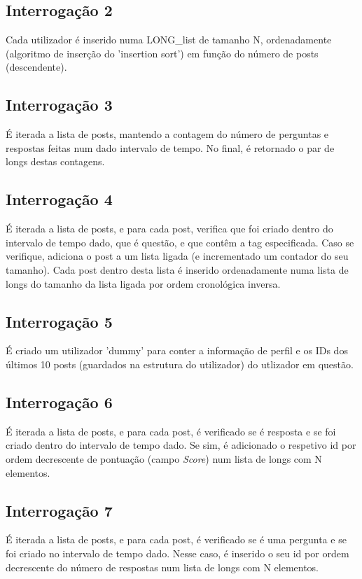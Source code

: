 \documentclass[10pt]{report}
\begin{document}
\subsection{Interrogação 2}
Cada utilizador é inserido numa LONG\_list de tamanho N, ordenadamente (algoritmo de inserção do 'insertion sort') em função do número de posts (descendente).

\subsection{Interrogação 3}
É iterada a lista de posts, mantendo a contagem do número de perguntas e respostas feitas num dado intervalo de tempo. No final, é retornado o par de longs destas contagens.

\subsection{Interrogação 4}
É iterada a lista de posts, e para cada post, verifica que foi criado dentro do intervalo de tempo dado, que é questão, e que contêm a tag especificada. Caso se verifique, adiciona o post a um lista ligada (e incrementado um contador do seu tamanho). Cada post dentro desta lista é inserido ordenadamente numa lista de longs do tamanho da lista ligada por ordem cronológica inversa.

\subsection{Interrogação 5}
É criado um utilizador 'dummy' para conter a informação de perfil e os IDs dos últimos 10 posts (guardados na estrutura do utilizador) do utlizador em questão.

\subsection{Interrogação 6}
É iterada a lista de posts, e para cada post, é verificado se é resposta e se foi criado dentro do intervalo de tempo dado. Se sim, é adicionado o respetivo id por ordem decrescente de pontuação (campo \textit{Score}) num lista de longs com N elementos.

\subsection{Interrogação 7}
É iterada a lista de posts, e para cada post, é verificado se é uma pergunta e se foi criado no intervalo de tempo dado. Nesse caso, é inserido o seu id por ordem decrescente do número de respostas num lista de longs com N elementos.
\end{document}
